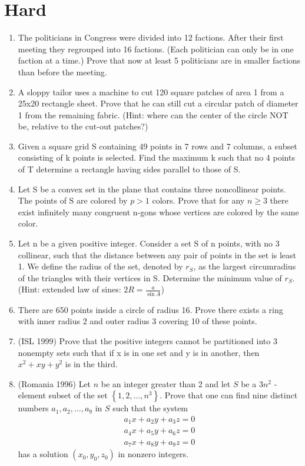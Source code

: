 \documentclass{article}
\begin{document}
\section{Hard}
\begin{enumerate}
\item The politicians in Congress were divided into 12 factions. After their first meeting they regrouped into 16 factions. (Each politician can only be in one faction at a time.) Prove that now at least 5 politicians are in smaller factions than before the meeting.
\item A sloppy tailor uses a machine to cut 120 square patches of area 1 from a 25x20 rectangle sheet. Prove that he can still cut a circular patch of diameter 1 from the remaining fabric. (Hint: where can the center of the circle NOT be, relative to the cut-out patches?)
\item Given a square grid S containing 49 points in 7 rows and 7 columns, a subset consisting of k points is selected. Find the maximum k such that no 4 points of T determine a rectangle having sides parallel to those of S.
\item Let S be a convex set in the plane that contains three noncollinear points. The points of S are colored by $p>1$ colors. Prove that for any $n \geq 3$ there exist infinitely many congruent n-gons whose vertices are colored by the same color.
\item Let n be a given positive integer. Consider a set S of n points, with no 3 collinear, such that
the distance between any pair of points in the set is least 1. We define the radius of the set,
denoted by $r_S$, as the largest circumradius of the triangles with their vertices in S. Determine
the minimum value of $r_S$. (Hint: extended law of sines: $2R=\frac{a}{\sin{A}}$)
\item There are 650 points inside a circle of radius 16. Prove there exists a ring with inner radius 2 and outer radius 3 covering 10 of these points.
\item (ISL 1999) Prove that the positive integers cannot be partitioned into 3 nonempty sets such that if x is in one set and y is in another, then $x^2+xy+y^2$ is in the third.
\item (Romania 1996) Let $n$ be an integer greater than 2 and let $S$ be a $3n^2$ - element subset of the set $\left\{1,2,\ldots,n^3\right\}$. Prove that one can find nine distinct numbers $a_{1},a_{2},\ldots,a_{9}$ in $S$ such that the system
\begin{eqnarray*}
a_{1}x+a_{2}y+a_{3}z=0\\
a_{4}x+a_{5}y+a_{6}z=0\\
a_{7}x+a_{8}y+a_{9}z=0
\end{eqnarray*}
has a solution $(x_{0},y_{0},z_{0})$ in nonzero integers.
\end{enumerate}
\end{document}
